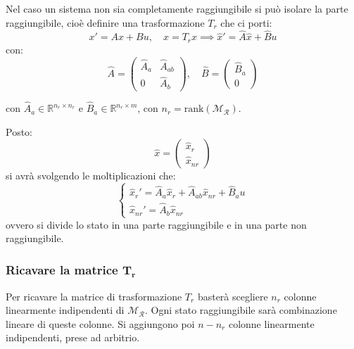 \documentclass[a4paper,11pt]{article}
\begin{document}
Nel caso un sistema non sia completamente raggiungibile si può isolare la parte raggiungibile, cioè definire una trasformazione $T_r$ che ci porti:
$$
x' = Ax + Bu, \quad \hat{x} = T_r x \implies \hat{x}' = \hat{A} \hat{x} + \hat{B} u
$$
con:
$$
\hat{A} = \begin{pmatrix}
\hat{A}_a & \hat{A}_{ab} \\
0 & \hat{A}_b
\end{pmatrix}, \quad
\hat{B} = \begin{pmatrix}
	\hat{B}_a \\
	0
\end{pmatrix}
$$

con $\hat{A}_a \in \mathbb{R}^{n_r \times n_r}$ e $\hat{B}_a \in \mathbb{R}^{n_r \times m}$, con $n_r = \mathrm{rank}(\mathcal{M}_\mathcal{R})$.

Posto:
$$
\hat{x} = \begin{pmatrix}
	\hat{x}_r \\ 
	\hat{x}_{nr}
\end{pmatrix}
$$
si avrà svolgendo le moltiplicazioni che:
\[
	\begin{cases}
		\hat{x}_r' = \hat{A}_a \hat{x}_r + \hat{A}_{ab} \hat{x}_{nr} + \hat{B}_a u\\
		\hat{x}_{nr}' = \hat{A}_b \hat{x}_{nr}
	\end{cases}
\]
ovvero si divide lo stato in una parte raggiungibile e in una parte non raggiungibile.

\subsubsection{Ricavare la matrice $\mathbf{T_r}$}
Per ricavare la matrice di trasformazione $T_r$ basterà scegliere $n_r$ colonne linearmente indipendenti di $\mathcal{M}_\mathcal{R}$.
Ogni stato raggiungibile sarà combinazione lineare di queste colonne.
Si aggiungono poi $n - n_r$ colonne linearmente indipendenti, prese ad arbitrio.
\end{document}
